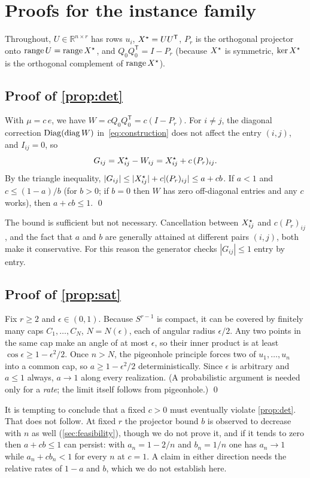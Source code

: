 \section{Proofs for the instance family}\label{app:family}

Throughout, $U\in\mathbb{R}^{n\times r}$ has rows $u_i$, $X^\star=UU^{\mathsf T}$,
$P_r$ is the orthogonal projector onto $\operatorname{range} U=\operatorname{range}X^\star$, and
$Q_0Q_0^{\mathsf T}=I-P_r$ (because $X^\star$ is symmetric, $\ker X^\star$ is the
orthogonal complement of $\operatorname{range}X^\star$).

\subsection{Proof of \cref{prop:det}}
With $\mu=c\,e$, we have $W=cQ_0Q_0^{\mathsf T}=c(I-P_r)$. For $i\ne j$, the
diagonal correction $\operatorname{Diag}(\operatorname{diag} W)$ in~\eqref{eq:construction} does not
affect the entry $(i,j)$, and $I_{ij}=0$, so
\[
  G_{ij}=X^\star_{ij}-W_{ij}=X^\star_{ij}+c\,(P_r)_{ij}.
\]
By the triangle inequality, $|G_{ij}|\le|X^\star_{ij}|+c|(P_r)_{ij}|\le a+cb$. If
$a<1$ and $c\le(1-a)/b$ (for $b>0$; if $b=0$ then $W$ has zero off-diagonal
entries and any $c$ works), then $a+cb\le1$. \qed

\begin{remark}
The bound is sufficient but not necessary. Cancellation between $X^\star_{ij}$ and
$c(P_r)_{ij}$, and the fact that $a$ and $b$ are generally attained at
different pairs $(i,j)$, both make it conservative. For this reason the
generator checks $|G_{ij}|\le1$ entry by entry.
\end{remark}

\subsection{Proof of \cref{prop:sat}}
Fix $r\ge2$ and $\epsilon\in(0,1)$. Because $S^{r-1}$ is compact, it can be
covered by finitely many caps
$C_1,\dots,C_{N}$, $N=N(\epsilon)$, each of angular radius $\epsilon/2$. Any
two points in the same cap make an angle of at most $\epsilon$, so their inner
product is at least $\cos\epsilon\ge1-\epsilon^2/2$. Once $n>N$, the
pigeonhole principle forces two of $u_1,\dots,u_n$ into a common cap, so
$a\ge1-\epsilon^2/2$ deterministically. Since $\epsilon$ is arbitrary and
$a\le1$ always, $a\to1$ along every realization. (A probabilistic argument is
needed only for a \emph{rate}; the limit itself follows from pigeonhole.)
\qed

\begin{remark}
It is tempting to conclude that a fixed $c>0$ must eventually violate
\cref{prop:det}. That does not follow. At fixed $r$ the projector bound $b$
is observed to decrease with $n$ as well (\cref{sec:feasibility}), though we
do not prove it, and if it tends to zero then $a+cb\le1$ can persist: with
$a_n=1-2/n$ and
$b_n=1/n$ one has $a_n\to1$ while $a_n+cb_n<1$ for every $n$ at $c=1$. A claim
in either direction needs the relative rates of $1-a$ and $b$, which we do not
establish here.
\end{remark}

